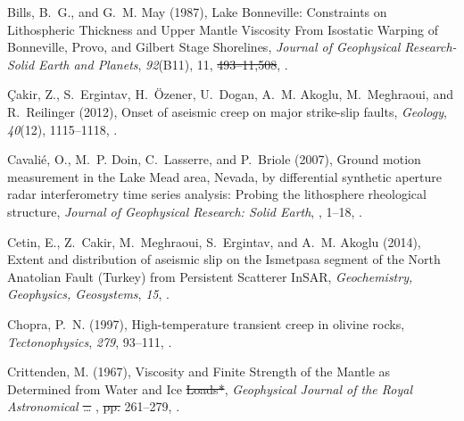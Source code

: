 \documentclass[draft,linenumbers]{AGUJournal}
\providecommand{\DIFadd}[1]{{\protect\color{blue}\uwave{#1}}} %
\providecommand{\DIFdel}[1]{{\protect\color{red}\sout{#1}}}                      %
\providecommand{\DIFaddbegin}{} %
\providecommand{\DIFaddend}{} %
\providecommand{\DIFdelbegin}{} %
\providecommand{\DIFdelend}{} %
\begin{document}
\begin{thebibliography}{52}
Bills, B.~G., and G.~M. May (1987), {Lake Bonneville: Constraints on Lithospheric Thickness and Upper Mantle Viscosity From Isostatic Warping of Bonneville, Provo, and Gilbert Stage Shorelines}, \textit{Journal of Geophysical Research-Solid Earth and Planets}, \textit{92}(B11), 11, \DIFdelbegin \DIFdel{493--11,508}\DIFdelend \DIFaddbegin \DIFadd{11493--11508}\DIFaddend , .

{\c{C}}akir, Z., S.~Ergintav, H.~{\"{O}}zener, U.~Dogan, A.~M. Akoglu, M.~Meghraoui, and R.~Reilinger (2012), {Onset of aseismic creep on major strike-slip faults}, \textit{Geology}, \textit{40}(12), 1115--1118, .

Cavali{\'{e}}, O., M.~P. Doin, C.~Lasserre, and P.~Briole (2007), {Ground motion measurement in the Lake Mead area, Nevada, by differential synthetic aperture radar interferometry time series analysis: Probing the lithosphere rheological structure}, \textit{Journal of Geophysical Research: Solid Earth}, \DIFdelbegin %
\DIFdelend \DIFaddbegin \textit{\DIFadd{112}}\DIFadd{(B03403)}\DIFaddend , 1--18, .

Cetin, E., Z.~Cakir, M.~Meghraoui, S.~Ergintav, and A.~M. Akoglu (2014), {Extent and distribution of aseismic slip on the Ismetpasa segment of the North Anatolian Fault (Turkey) from Persistent Scatterer InSAR}, \textit{Geochemistry, Geophysics, Geosystems}, \textit{15}, \DIFdelbegin %
\DIFdelend \DIFaddbegin {}\DIFaddend .

Chopra, P.~N. (1997), {High-temperature transient creep in olivine rocks}, \textit{Tectonophysics}, \textit{279}, 93--111, .

Crittenden, M. (1967), {Viscosity and Finite Strength of the Mantle as Determined from Water and Ice \DIFdelbegin \DIFdel{Loads*}\DIFdelend \DIFaddbegin \DIFadd{Loads}\DIFaddend }, \textit{Geophysical Journal of the Royal Astronomical \DIFdelbegin %
\DIFdel{\ldots}%
\DIFdelend \DIFaddbegin \DIFadd{Society}\DIFaddend }, \DIFdelbegin \DIFdel{pp. }\DIFdelend 261--279, .


\end{thebibliography}
\end{document}
